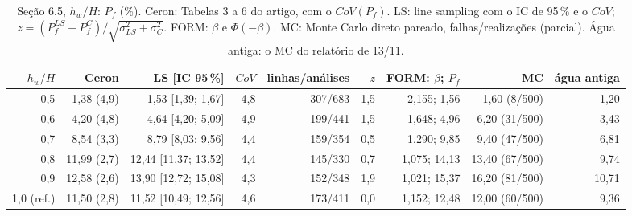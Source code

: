 \begin{table}[htbp]\centering\scriptsize\setlength{\tabcolsep}{3pt}
\caption{Seção 6.5, $h_w/H$: $P_f$ (\%). Ceron: Tabelas 3 a 6 do artigo, com o $CoV(P_f)$. LS: line sampling com o IC de 95\,\% e o $CoV$; $z = (P_f^{LS} - P_f^{C})/\sqrt{\sigma_{LS}^2 + \sigma_C^2}$. FORM: $\beta$ e $\Phi(-\beta)$. MC: Monte Carlo direto pareado, falhas/realizações (parcial). Água antiga: o MC do relatório de 13/11.}\label{tab:pf_hw}
\begin{tabular}{rrrrrrrrr}\toprule
$h_w/H$ & Ceron & LS [IC 95\,\%] & $CoV$ & linhas/análises & $z$ & FORM: $\beta$; $P_f$ & MC & água antiga \\\midrule
0{,}5 & 1{,}38 (4{,}9) & 1{,}53 [1{,}39; 1{,}67] & 4{,}8 & 307/683 & 1{,}5 & 2{,}155; 1{,}56 & 1{,}60 (8/500) & 1{,}20 \\
0{,}6 & 4{,}20 (4{,}8) & 4{,}64 [4{,}20; 5{,}09] & 4{,}9 & 199/441 & 1{,}5 & 1{,}648; 4{,}96 & 6{,}20 (31/500) & 3{,}43 \\
0{,}7 & 8{,}54 (3{,}3) & 8{,}79 [8{,}03; 9{,}56] & 4{,}4 & 159/354 & 0{,}5 & 1{,}290; 9{,}85 & 9{,}40 (47/500) & 6{,}81 \\
0{,}8 & 11{,}99 (2{,}7) & 12{,}44 [11{,}37; 13{,}52] & 4{,}4 & 145/330 & 0{,}7 & 1{,}075; 14{,}13 & 13{,}40 (67/500) & 9{,}74 \\
0{,}9 & 12{,}58 (2{,}6) & 13{,}90 [12{,}72; 15{,}08] & 4{,}3 & 152/348 & 1{,}9 & 1{,}021; 15{,}37 & 16{,}20 (81/500) & 10{,}71 \\
1{,}0 (ref.) & 11{,}50 (2{,}8) & 11{,}52 [10{,}49; 12{,}56] & 4{,}6 & 173/411 & 0{,}0 & 1{,}152; 12{,}48 & 12{,}00 (60/500) & 9{,}36 \\
\bottomrule\end{tabular}\end{table}
